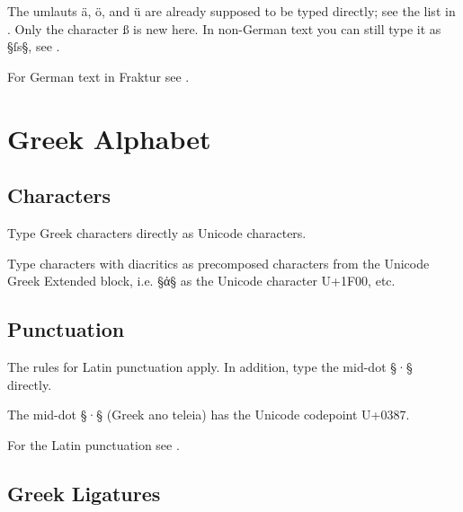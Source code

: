 \begin{note}
The umlauts ä, ö, and ü are already supposed to be typed directly; see the list in . Only the character ß is new here. In non-German text you can still type it as §{ſs}§, see .
\end{note}

\begin{crossref}
For German text in Fraktur see .
\end{crossref}


\section{Greek Alphabet}

\tocspace
\subsection{Characters}

\begin{mainrule}
Type Greek characters directly as Unicode characters.
\end{mainrule}

\begin{clarification}
Type characters with diacritics as precomposed characters from the Unicode Greek Extended block, i.e. §ἀ§ as the Unicode character U+1F00, etc.
\end{clarification}


\tocspace
\subsection{Punctuation}
\label{section greek punctuation}

\begin{mainrule}
The rules for Latin punctuation apply. In addition, type the mid-dot §·§ directly.
\end{mainrule}

\begin{clarification}
The mid-dot §·§ (Greek ano teleia) has the Unicode codepoint U+0387.
\end{clarification}

\begin{crossref}
For the Latin punctuation see .
\end{crossref}


\tocspace
\subsection{Greek Ligatures}
\label{section greek ligatures}

